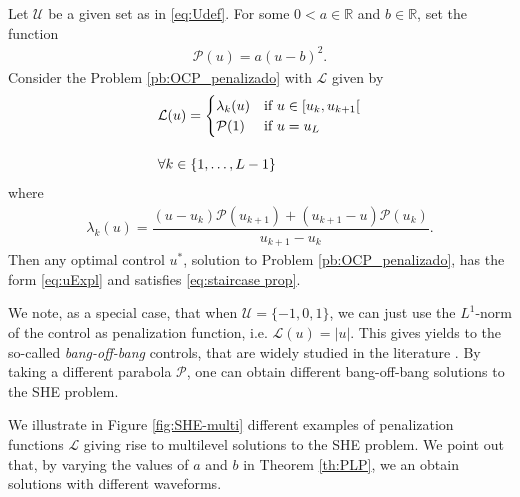 \documentclass[twocolumn]{autart}    %
\begin{document}
\vspace{1em}
\begin{theorem}\label{th:PLP}
Let $\mathcal{U}$ be a given set as in \eqref{eq:Udef}.
For some $0<a\in\mathbb{R}$ and $b\in \mathbb{R}$, set the function
\begin{align*}
	\mathcal{P}(u) = a (u-b)^2.
\end{align*}
Consider the Problem \ref{pb:OCP_penalizado} with $\mathcal{L}$ given by
\begin{align}\label{eq:PLP}
	&\mathcal{L}(u) = \begin{cases}
            \lambda_k(u) & \text{if }  u \in [u_k,u_{k+1}[ \\ \mathcal{P}(1) & \text{if } u = u_{L} 
    \end{cases} 
	\\[10pt]
	&\notag \forall k \in \{1,\dots,L-1\} 
\end{align}
where 
\begin{align}\label{eq:lambda k}
	\lambda_k(u) = \dfrac{ (u-u_k)\mathcal{P}(u_{k+1}) + (u_{k+1}- u) \mathcal{P}(u_k)}{u_{k+1} - u_k}.
\end{align}
Then any optimal control $u^\ast$, solution to Problem \ref{pb:OCP_penalizado}, has the form \eqref{eq:uExpl} and satisfies \eqref{eq:staircase prop}.
\end{theorem}

\bigskip

\begin{remark}
We note, as a special case, that when  $\mathcal{U}= \{-1,0,1\}$, we can just use the $L^1$-norm of the control as penalization function, i.e. $\mathcal{L}(u) = |u|$. This gives yields to the so-called \emph{bang-off-bang} controls, that are widely studied in the literature \cite{Wang2020}. By taking a different parabola $\mathcal{P}$, one can obtain different bang-off-bang solutions to the SHE problem.
\end{remark}

We illustrate in Figure \ref{fig:SHE-multi} different examples of penalization functions $\mathcal{L}$ giving rise to multilevel solutions to the SHE problem. We point out that, by varying the values of $a$ and $b$ in Theorem \ref{th:PLP}, we an obtain solutions with different waveforms.
\end{document}
